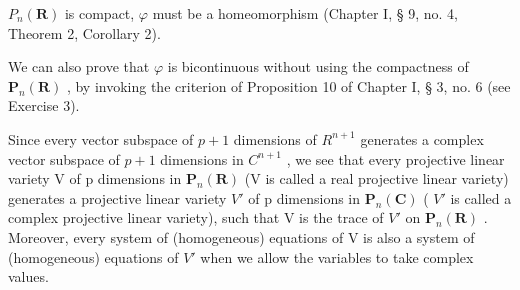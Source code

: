 \(P_{n}(\mathbf{R})\) is compact, \(\varphi\) must be a homeomorphism (Chapter I, § 9, no. 4, Theorem 2, Corollary 2).

We can also prove that \(\varphi\) is bicontinuous without using the compactness of \(\mathbf{P}_n(\mathbf{R})\) , by invoking the criterion of Proposition 10 of Chapter I, § 3, no. 6 (see Exercise 3).

Since every vector subspace of \(p + 1\) dimensions of \(R^{n+1}\) generates a complex vector subspace of \(p + 1\) dimensions in \(C^{n+1}\) , we see that every projective linear variety V of p dimensions in \(\mathbf{P}_{n}(\mathbf{R})\) (V is called a real projective linear variety) generates a projective linear variety \(V'\) of p dimensions in \(\mathbf{P}_{n}(\mathbf{C})\) ( \(V'\) is called a complex projective linear variety), such that V is the trace of \(V'\) on \(\mathbf{P}_{n}(\mathbf{R})\) . Moreover, every system of (homogeneous) equations of V is also a system of (homogeneous) equations of \(V'\) when we allow the variables to take complex values.

